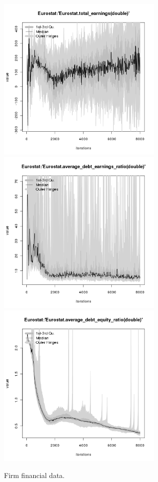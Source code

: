 \begin{figure}[H!]
\begin{minipage}{17cm}
\includegraphics[width=8cm]{./benchmark_plots/Eurostat-total_earnings.png}\\
\includegraphics[width=8cm]{./benchmark_plots/Eurostat-average_debt_earnings_ratio.png}
\includegraphics[width=8cm]{./benchmark_plots/Eurostat-average_debt_equity_ratio.png}
\end{minipage}
\caption{Firm financial data.}
\label{Figure: Firm Financial Data}
\end{figure}


